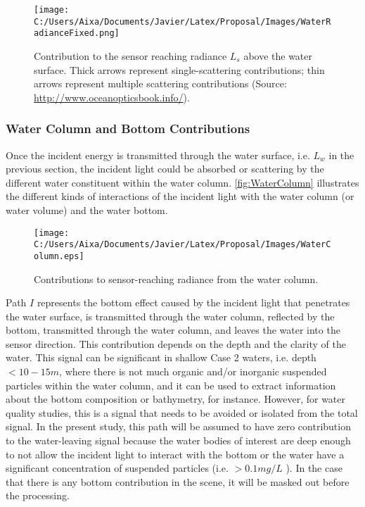 \begin{figure}[htb]
  \centering
  \texttt{[image: C:/Users/Aixa/Documents/Javier/Latex/Proposal/Images/WaterRadianceFixed.png]}
\caption{Contribution to the sensor reaching radiance $L_s$ above the water surface. Thick arrows represent single-scattering contributions; thin arrows represent multiple scattering contributions (Source: \protect\url{http://www.oceanopticsbook.info/}).}
\label{fig:watercontribution} 
\end{figure}
\subsubsection{Water Column and Bottom Contributions}
Once the incident energy is transmitted through the water surface, i.e. $L_w$ in the previous section, the incident light could be absorbed or scattering by the different water constituent within the water column. \autoref{fig:WaterColumn} illustrates the different kinds of interactions of the incident light with the water column (or water volume) and the water bottom.

\begin{figure}[htb]
  \centering
      \texttt{[image: C:/Users/Aixa/Documents/Javier/Latex/Proposal/Images/WaterColumn.eps]}
  \caption{Contributions to sensor-reaching radiance from the water column.}
  \label{fig:WaterColumn}
\end{figure}

Path $I$ represents the bottom effect caused by the incident light that penetrates the water surface, is transmitted through the water column, reflected by the bottom, transmitted through the water column, and leaves the water into the sensor direction. This contribution depends on the depth and the clarity of the water. This signal can be significant in shallow Case 2 waters, i.e. depth $<10-15m$, where there is not much organic and/or inorganic suspended particles within the water column, and it can be used to extract information about the bottom composition or bathymetry, for instance. However, for water quality studies, this is a signal that needs to be avoided or isolated from the total signal. In the present study, this path will be assumed to have zero contribution to the water-leaving signal because the water bodies of interest are deep enough to not allow the incident light to interact with the bottom or the water have a significant concentration of suspended particles (i.e. $>0.1mg/L$ \cite{Pahlevan:2012}). In the case that there is any bottom contribution in the scene, it will be masked out before the processing.


